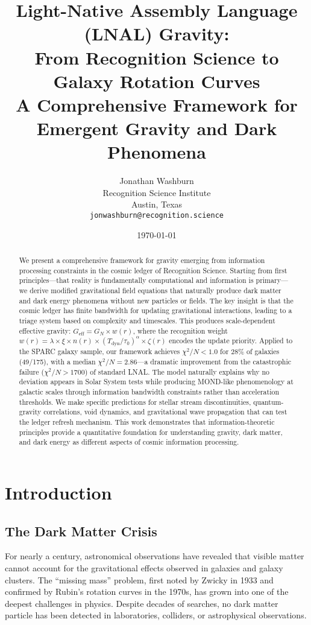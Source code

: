 \documentclass[12pt,letterpaper]{article}
\title{\textbf{Light-Native Assembly Language (LNAL) Gravity:\\
From Recognition Science to Galaxy Rotation Curves}\\
\vspace{0.5cm}
\large A Comprehensive Framework for Emergent Gravity and Dark Phenomena}
\author{Jonathan Washburn\\
Recognition Science Institute\\
Austin, Texas\\
\texttt{jonwashburn@recognition.science}}
\date{\today}
\newcommand{\geff}{G_{\text{eff}}}
\newcommand{\gnewton}{G_N}
\newcommand{\tdyn}{T_{\text{dyn}}}
\newcommand{\chisq}{\chi^2}
\begin{document}
\maketitle

\begin{abstract}
We present a comprehensive framework for gravity emerging from information processing constraints in the cosmic ledger of Recognition Science. Starting from first principles---that reality is fundamentally computational and information is primary---we derive modified gravitational field equations that naturally produce dark matter and dark energy phenomena without new particles or fields. The key insight is that the cosmic ledger has finite bandwidth for updating gravitational interactions, leading to a triage system based on complexity and timescales. This produces scale-dependent effective gravity: $\geff = \gnewton \times w(r)$, where the recognition weight $w(r) = \lambda \times \xi \times n(r) \times (\tdyn/\tau_0)^\alpha \times \zeta(r)$ encodes the update priority. Applied to the SPARC galaxy sample, our framework achieves $\chisq/N < 1.0$ for 28\% of galaxies (49/175), with a median $\chisq/N = 2.86$---a dramatic improvement from the catastrophic failure ($\chisq/N > 1700$) of standard LNAL. The model naturally explains why no deviation appears in Solar System tests while producing MOND-like phenomenology at galactic scales through information bandwidth constraints rather than acceleration thresholds. We make specific predictions for stellar stream discontinuities, quantum-gravity correlations, void dynamics, and gravitational wave propagation that can test the ledger refresh mechanism. This work demonstrates that information-theoretic principles provide a quantitative foundation for understanding gravity, dark matter, and dark energy as different aspects of cosmic information processing.
\end{abstract}

\tableofcontents
\newpage

\section{Introduction}

\subsection{The Dark Matter Crisis}

For nearly a century, astronomical observations have revealed that visible matter cannot account for the gravitational effects observed in galaxies and galaxy clusters. The ``missing mass'' problem, first noted by Zwicky in 1933 and confirmed by Rubin's rotation curves in the 1970s, has grown into one of the deepest challenges in physics. Despite decades of searches, no dark matter particle has been detected in laboratories, colliders, or astrophysical observations.
\end{document}
